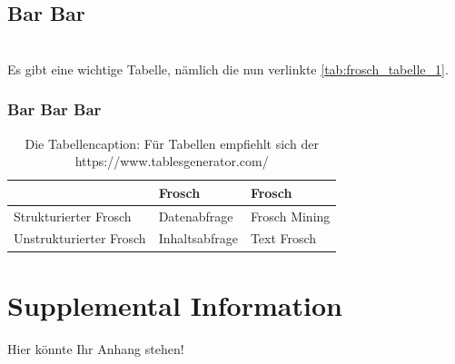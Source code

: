 \documentclass[
	12pt,
    a4paper,
    egregdoesnotlikesansseriftitles, %
    toc=chapterentrywithdots,
    oneside, openany,
    titlepage,
    parskip=half,
    headings=normal,  %
    listof=totoc,
    bibliography=totoc,
    index=totoc,
    captions=tableheading,  %
    listof=flat,
    numbers=noenddot, %
    final]
    {scrbook}
\begin{document}
\section{Bar Bar}
\blindtext
\\Es gibt eine wichtige Tabelle, nämlich die nun verlinkte \autoref{tab:frosch_tabelle_1}.

\subsection{Bar Bar Bar}
\blindtext
	\begin{table}[h]
	\centering
		\begin{tabular}{l|l|l}
		                        & Frosch         & Frosch        \\ \hline
		Strukturierter Frosch   & Datenabfrage   & Frosch Mining \\ \hline
		Unstrukturierter Frosch & Inhaltsabfrage & Text Frosch
		\end{tabular}%
	\caption[Eine Tabelle über Frösche]{Die Tabellencaption: Für Tabellen empfiehlt sich der https://www.tablesgenerator.com/}
	\label{tab:frosch_tabelle_1}
	\end{table}
\blindtext

\backmatter

\printnoidxglossaries


%

\clearpage %


\appendix
\chapter{Supplemental Information}\label{app:supplemental-information}
Hier könnte Ihr Anhang stehen!


\end{document}
